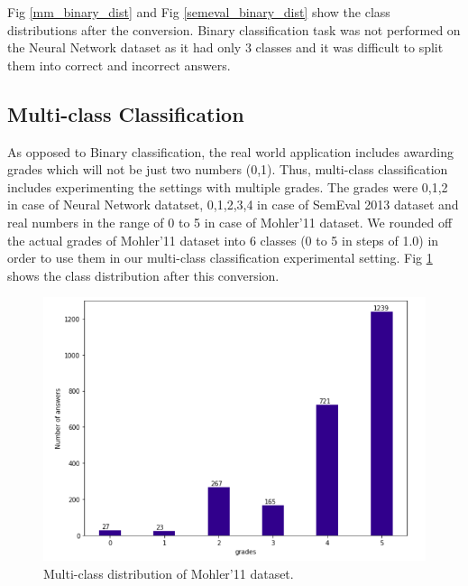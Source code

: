     Fig \ref{mm_binary_dist} and Fig \ref{semeval_binary_dist} show the class distributions after the conversion. Binary classification task was not performed on the Neural Network dataset as it had only 3 classes and it was difficult to split them into correct and incorrect answers. 
    
    \subsection{Multi-class Classification}
    
    As opposed to Binary classification, the real world application includes awarding grades which will not be just two numbers (0,1). Thus, multi-class classification includes experimenting the settings with multiple grades. The grades were 0,1,2 in case of Neural Network datatset, 0,1,2,3,4 in case of SemEval 2013 dataset and real numbers in the range of 0 to 5 in case of Mohler'11 dataset. We rounded off the actual grades of Mohler'11 dataset into 6 classes (0 to 5 in steps of 1.0) in order to use them in our multi-class classification experimental setting. Fig \ref{mohler_multi_dist} shows the class distribution after this conversion.
    
    \begin{figure}[h]
    	\centering
    	\includegraphics[scale=0.4]{images/mohler_multi_dist}
    	\caption{Multi-class distribution of Mohler'11 dataset.}
    	\label{mohler_multi_dist}
    \end{figure}
    
    
    

